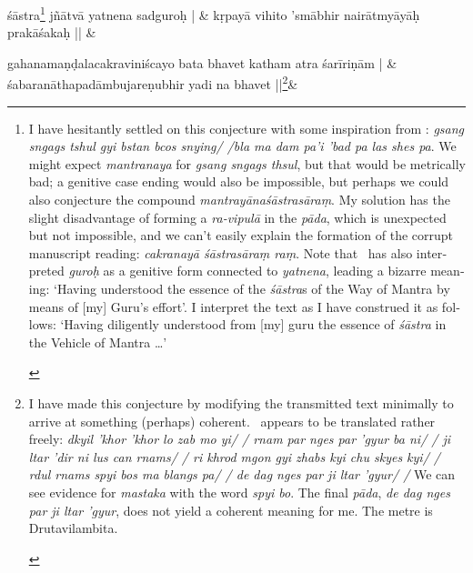 \documentclass[naipra.tex]{subfiles}
\begin{document}
\begin{sanskrit}
\medskip\versequote
{} śāstra\footnote{\begin{english}
	I have hesitantly settled on this conjecture with some inspiration from \TIB : \emph{gsang sngags tshul gyi bstan bcos snying/ /bla ma dam pa'i 'bad pa las shes pa}.
	We might expect \emph{mantranaya} for \emph{gsang sngags thsul}, but that would be metrically bad; a genitive case ending would also be impossible, but perhaps we could also conjecture the compound \emph{mantrayānaśāstrasāraṃ}.
	My solution has the slight disadvantage of forming a \emph{ra-vipulā} in the \emph{pāda}, which is unexpected but not impossible, and we can't easily explain the formation of the corrupt manuscript reading: \emph{cakranayā śāstrasāraṃ raṃ}.
	Note that \TIB\ has also interpreted \emph{guroḥ} as a genitive form connected to \emph{yatnena}, leading a bizarre meaning: `Having understood the essence of the \emph{śāstra}s of the Way of Mantra by means of [my] Guru's effort'.
	I interpret the text as I have construed it as follows: `Having diligently understood from [my] guru the essence of \emph{śāstra} in the Vehicle of Mantra \ldots '	
\end{english}} jñātvā yatnena sadguroḥ | &
kṛpayā vihito 'smābhir nairātmyāyāḥ prakāśakaḥ || \&



\medskip\versequote
gahanamaṇḍalacakraviniścayo bata bhavet katham atra śarīriṇām | &
śabaranāthapadāmbujareṇubhir yadi na  bhavet ||\footnote{\begin{english}
	I have made this conjecture by modifying the transmitted text minimally to arrive at something (perhaps) coherent.
	\TIB\ appears to be translated rather freely: \emph{%
		dkyil 'khor 'khor lo zab mo yi/ /
	 	rnam par nges par 'gyur ba ni/ /
		ji ltar 'dir ni lus can rnams/ /
		ri khrod mgon gyi zhabs kyi chu skyes kyi/ /
		rdul rnams spyi bos ma blangs pa/ /
		de dag nges par ji ltar 'gyur/ /%
	} We can see evidence for \emph{mastaka} with the word \emph{spyi bo}.
	The final \emph{pāda}, \emph{de dag nges par ji ltar 'gyur}, does not yield a coherent meaning for me.
	The metre is Drutavilambita.
\end{english}}\&


\end{sanskrit}
\end{document}
